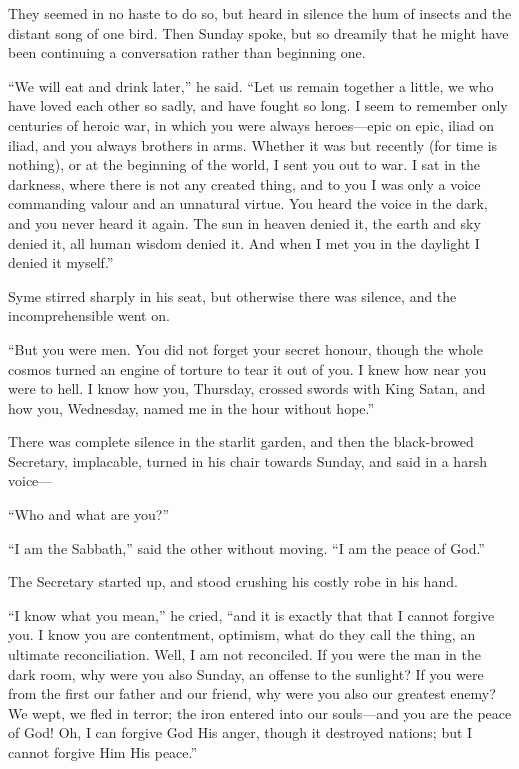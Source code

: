 They seemed in no haste to do so, but heard in silence the hum of insects and the distant song of one bird. Then Sunday spoke, but so dreamily that he might have been continuing a conversation rather than beginning one.

“We will eat and drink later,” he said. “Let us remain together a little, we who have loved each other so sadly, and have fought so long. I seem to remember only centuries of heroic war, in which you were always heroes⁠—epic on epic, iliad on iliad, and you always brothers in arms. Whether it was but recently (for time is nothing), or at the beginning of the world, I sent you out to war. I sat in the darkness, where there is not any created thing, and to you I was only a voice commanding valour and an unnatural virtue. You heard the voice in the dark, and you never heard it again. The sun in heaven denied it, the earth and sky denied it, all human wisdom denied it. And when I met you in the daylight I denied it myself.”

Syme stirred sharply in his seat, but otherwise there was silence, and the incomprehensible went on.

“But you were men. You did not forget your secret honour, though the whole cosmos turned an engine of torture to tear it out of you. I knew how near you were to hell. I know how you, Thursday, crossed swords with King Satan, and how you, Wednesday, named me in the hour without hope.”

There was complete silence in the starlit garden, and then the black-browed Secretary, implacable, turned in his chair towards Sunday, and said in a harsh voice⁠—

“Who and what are you?”

“I am the Sabbath,” said the other without moving. “I am the peace of God.”

The Secretary started up, and stood crushing his costly robe in his hand.

“I know what you mean,” he cried, “and it is exactly that that I cannot forgive you. I know you are contentment, optimism, what do they call the thing, an ultimate reconciliation. Well, I am not reconciled. If you were the man in the dark room, why were you also Sunday, an offense to the sunlight? If you were from the first our father and our friend, why were you also our greatest enemy? We wept, we fled in terror; the iron entered into our souls⁠—and you are the peace of God! Oh, I can forgive God His anger, though it destroyed nations; but I cannot forgive Him His peace.”

